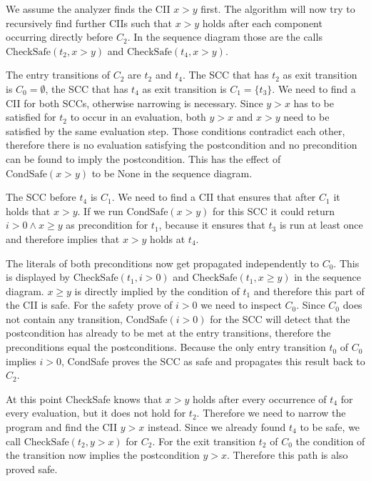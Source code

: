 We assume the analyzer finds the CII $x > y$ first.
The algorithm will now try to recursively find further CIIs such that $x > y$ holds after each component occurring directly before $C_2$.
In the sequence diagram those are the calls $\text{CheckSafe}(t_2, x > y)$ and $\text{CheckSafe}(t_4, x > y)$.

The entry transitions of $C_2$ are $t_2$ and $t_4$.
The SCC that has $t_2$ as exit transition is $C_0 = \emptyset$, the SCC that has $t_4$ as exit transition is $C_1 = \lbrace t_3 \rbrace$.
We need to find a CII for both SCCs, otherwise narrowing is necessary.
Since $y > x$ has to be satisfied for $t_2$ to occur in an evaluation, both $y > x$ and $x > y$ need to be satisfied by the same evaluation step.
Those conditions contradict each other, therefore there is no evaluation satisfying the postcondition and no precondition can be found to imply the postcondition.
This has the effect of $\text{CondSafe}(x > y)$ to be None in the sequence diagram.

The SCC before $t_4$ is $C_1$.
We need to find a CII that ensures that after $C_1$ it holds that $x > y$.
If we run $\text{CondSafe}(x > y)$ for this SCC it could return $i > 0 \wedge x \geq y$ as precondition for $t_1$, because it ensures that $t_3$ is run at least once and therefore implies that $x > y$ holds at $t_4$.

The literals of both preconditions now get propagated independently to $C_0$.
This is displayed by $\text{CheckSafe}(t_1, i > 0)$ and $\text{CheckSafe}(t_1, x \geq y)$ in the sequence diagram.
$x \geq y$ is directly implied by the condition of $t_1$ and therefore this part of the CII is safe.
For the safety prove of $i > 0$ we need to inspect $C_0$.
Since $C_0$ does not contain any transition, $\text{CondSafe}(i > 0)$ for the SCC will detect that the postcondition has already to be met at the entry transitions, therefore the preconditions equal the postconditions.
Because the only entry transition $t_0$ of $C_0$ implies $i > 0$, CondSafe proves the SCC as safe and propagates this result back to $C_2$.

At this point CheckSafe knows that $x > y$ holds after every occurrence of $t_4$ for every evaluation, but it does not hold for $t_2$.
Therefore we need to narrow the program and find the CII $y > x$ instead.
Since we already found $t_4$ to be safe, we call $\text{CheckSafe}(t_2, y > x)$ for $C_2$.
For the exit transition $t_2$ of $C_0$ the condition of the transition now implies the postcondition $y > x$.
Therefore this path is also proved safe.


